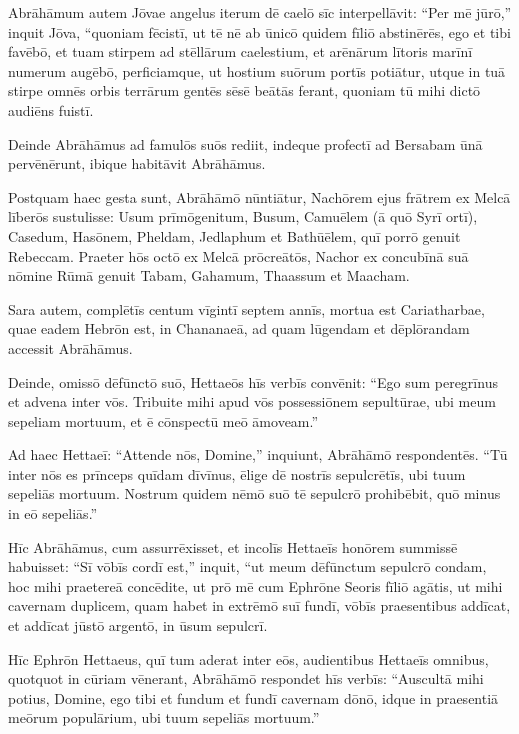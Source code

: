 \Versus Abrāhāmum autem Jōvae angelus iterum dē caelō sīc interpellāvit:
\Versus ``Per mē jūrō,'' inquit Jōva, ``quoniam fēcistī, ut tē nē ab ūnicō quidem fīliō abstinērēs,
\Versus ego et tibi favēbō, et tuam stirpem ad stēllārum caelestium, et arēnārum lītoris marīnī numerum augēbō, perficiamque, ut hostium suōrum portīs potiātur,
\Versus utque in tuā stirpe omnēs orbis terrārum gentēs sēsē beātās ferant, quoniam tū mihi dictō audiēns fuistī.

\Versus Deinde Abrāhāmus ad famulōs suōs rediit, indeque profectī ad Bersabam ūnā pervēnērunt, ibique habitāvit Abrāhāmus.

\Versus Postquam haec gesta sunt, Abrāhāmō nūntiātur, Nachōrem ejus frātrem ex Melcā līberōs sustulisse:
\Versus Usum prīmōgenitum, Busum, Camuēlem (ā quō Syrī ortī),
\Versus Casedum, Hasōnem, Pheldam, Jedlaphum et Bathūēlem,
\Versus quī porrō genuit Rebeccam. Praeter hōs octō ex Melcā prōcreātōs,
\Versus Nachor ex concubīnā suā nōmine Rūmā genuit Tabam, Gahamum, Thaassum et Maacham.



\Caput
\Versus Sara autem, complētīs centum vīgintī septem annīs,
\Versus mortua est Cariatharbae, quae eadem Hebrōn est, in Chananaeā, ad quam lūgendam et dēplōrandam accessit Abrāhāmus.

\Versus Deinde, omissō dēfūnctō suō, Hettaeōs hīs verbīs convēnit:
\Versus ``Ego sum peregrīnus et advena inter vōs. Tribuite mihi apud vōs possessiōnem sepultūrae, ubi meum sepeliam mortuum, et ē cōnspectū meō āmoveam.''

\Versus Ad haec Hettaeī:
\Versus ``Attende nōs, Domine,'' inquiunt, Abrāhāmō respondentēs. ``Tū inter nōs es prīnceps quīdam dīvīnus, ēlige dē nostrīs sepulcrētīs, ubi tuum sepeliās mortuum. Nostrum quidem nēmō suō tē sepulcrō prohibēbit, quō minus in eō sepeliās.''

\Versus Hīc Abrāhāmus, cum assurrēxisset, et incolīs Hettaeīs honōrem summissē habuisset:
\Versus ``Sī vōbīs cordī est,'' inquit, ``ut meum dēfūnctum sepulcrō condam, hoc mihi praetereā concēdite, ut prō mē cum Ephrōne Seoris fīliō agātis,
\Versus ut mihi cavernam duplicem, quam habet in extrēmō suī fundī, vōbīs praesentibus addīcat, et addīcat jūstō argentō, in ūsum sepulcrī.

\Versus Hīc Ephrōn Hettaeus, quī tum aderat inter eōs, audientibus Hettaeīs omnibus, quotquot in cūriam vēnerant, Abrāhāmō respondet hīs verbīs:
\Versus ``Auscultā mihi potius, Domine, ego tibi et fundum et fundī cavernam dōnō, idque in praesentiā meōrum populārium, ubi tuum sepeliās mortuum.''

